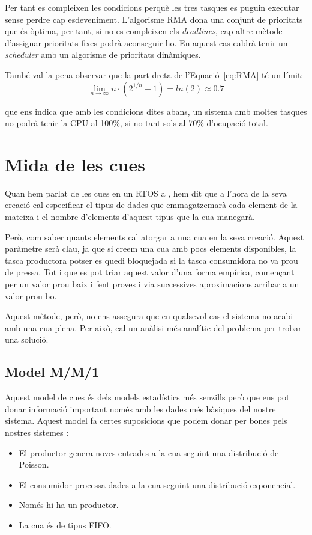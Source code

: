 Per tant es compleixen les condicions perquè les tres tasques es puguin executar sense perdre cap esdeveniment. L'algorisme RMA dona una conjunt de prioritats que és òptima, per tant, si no es compleixen els {\em deadlines}, cap altre mètode d'assignar prioritats fixes podrà aconseguir-ho. En aquest cas caldrà tenir un {\em scheduler} amb un algorisme de prioritats dinàmiques.

També val la pena observar que la part dreta de l'Equació~\ref{eq:RMA} té un límit:
\begin{equation*}
 \lim_{n\to\infty} n \cdot (2^{1/n}-1) = ln(2) \approx 0.7
\end{equation*}

que ens indica que amb les condicions dites abans, un sistema amb moltes tasques no podrà tenir la CPU al 100\%, si no tant sols al 70\% d'ocupació total.

\section{Mida de les cues}
\label{sec:mida_cues}
Quan hem parlat de les cues en un \gls{RTOS} a , hem dit que a l'hora de la seva creació cal especificar el tipus de dades que emmagatzemarà cada element de la mateixa i el nombre d'elements d'aquest tipus que la cua manegarà.

Però, com saber quants elements cal atorgar a una cua en la seva creació. Aquest paràmetre serà clau, ja que si creem una cua amb pocs elements disponibles, la tasca productora potser es quedi bloquejada si la tasca consumidora no va prou de pressa. Tot i que es pot triar aquest valor d'una forma empírica, començant per un valor prou baix i fent proves i via successives aproximacions arribar a un valor prou bo.

Aquest mètode, però, no ens assegura que en qualsevol cas el sistema no acabi amb una cua plena. Per això, cal un anàlisi més analític del problema per trobar una solució.

\subsection{Model M/M/1}
\label{sub:mm1}

Aquest model de cues és dels models estadístics més senzills però que ens pot donar informació important només amb les dades més bàsiques del nostre sistema. Aquest model fa certes suposicions que podem donar per bones pels nostres sistemes \cite{mm1_1}\cite{mm1_2}\cite{mm1_3}\cite{mm1_4}:
\begin{itemize}
 \item El productor genera noves entrades a la cua seguint una distribució de Poisson.
 \item El consumidor processa dades a la cua seguint una distribució exponencial.
 \item Només hi ha un productor.
 \item La cua és de tipus FIFO.
\end{itemize}

